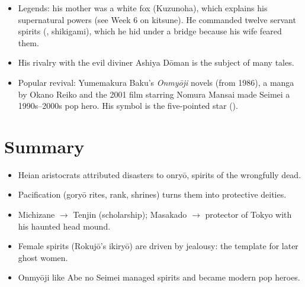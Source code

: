 \begin{itemize}
  \item Legends: his mother was a white fox (Kuzunoha), which explains his supernatural
        powers (see Week 6 on kitsune). He commanded twelve servant spirits
        (, shikigami), which he hid under a bridge because his wife feared them.
  \item His rivalry with the evil diviner Ashiya Dōman is the subject of many tales.
  \item Popular revival: Yumemakura Baku's \emph{Onmyōji} novels (from 1986), a manga by
        Okano Reiko and the 2001 film starring Nomura Mansai made Seimei a 1990s--2000s pop
        hero. His symbol is the five-pointed star ().
\end{itemize}

\begin{center}
\end{center}

\section*{Summary}
\begin{itemize}
  \item Heian aristocrats attributed disasters to onryō, spirits of the wrongfully dead.
  \item Pacification (goryō rites, rank, shrines) turns them into protective deities.
  \item Michizane $\to$ Tenjin (scholarship); Masakado $\to$ protector of Tokyo with his
        haunted head mound.
  \item Female spirits (Rokujō's ikiryō) are driven by jealousy: the template for later
        ghost women.
  \item Onmyōji like Abe no Seimei managed spirits and became modern pop heroes.
\end{itemize}
